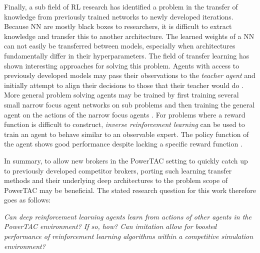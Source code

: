 Finally, a sub field of \ac{RL} research has identified a problem in the transfer of knowledge from previously trained
networks to newly developed iterations. Because \ac{NN} are mostly black boxes to researchers, it is difficult to
extract knowledge and transfer this to another architecture. The learned weights of a \ac{NN} can not easily be
transferred between models, especially when architectures fundamentally differ in their hyperparameters. The field of
transfer learning has shown interesting approaches for solving this problem. Agents with access to previously developed
models may pass their observations to the \emph{teacher agent} and initially attempt to align their decisions to those
that their teacher would do \cite[]{schmitt2018kickstarting}. More general problem solving agents may be trained by
first training several small narrow focus agent networks on sub problems and then training the general agent on the
actions of the narrow focus agents \cite[]{parisotto2015actor}. For problems where a reward function is difficult to
construct, \emph{inverse reinforcement learning} can be used to train an agent to behave similar to an observable
expert. The policy function of the agent shows good performance despite lacking a specific reward function
\cite[]{NG2004Apprentice}.

In summary, to allow new brokers in the \ac{PowerTAC} setting to quickly catch up to previously developed competitor brokers,
porting such learning transfer methods and their underlying deep architectures to the problem scope of \ac{PowerTAC}
may be beneficial. The stated research question for this work therefore goes as follows:

\emph{Can deep reinforcement learning agents learn from actions of other agents in the \ac{PowerTAC} environment? If so, how? Can imitation allow for
boosted performance of reinforcement learning algorithms within a competitive simulation environment?}



